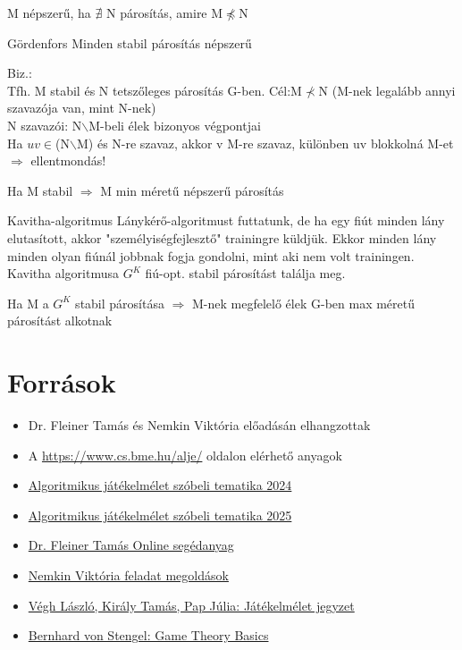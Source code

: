 	\begin{observation}{}{}
		M népszerű, ha $\nexists$ N párosítás, amire M$\npreceq$N
	\end{observation}
	
	\begin{theorem}{Gördenfors}{}
		Minden stabil párosítás népszerű
	\end{theorem}
	Biz.:\\
	Tfh. M stabil és N tetszőleges párosítás G-ben. Cél:M$\nprec$N (M-nek legalább annyi szavazója van, mint N-nek)\\
	N szavazói: N$\backslash$M-beli élek bizonyos végpontjai\\
	Ha $uv \in$(N$\backslash$M) és N-re szavaz, akkor v M-re szavaz, különben uv blokkolná M-et $\Rightarrow$ ellentmondás!
	
	\begin{statement}{}{}
		Ha M stabil $\Rightarrow$ M min méretű népszerű párosítás
	\end{statement}
	
	\begin{theorem}{Kavitha-algoritmus}{}
		Lánykérő-algoritmust futtatunk, de ha egy fiút minden lány elutasított, akkor "személyiségfejlesztő" trainingre küldjük. Ekkor minden lány minden olyan fiúnál jobbnak fogja gondolni, mint aki nem volt trainingen.\\
		Kavitha algoritmusa $G^K$ fiú-opt. stabil párosítást találja meg.
	\end{theorem}
	
	\begin{theorem}{}{}
		Ha M a $G^K$ stabil párosítása $\Rightarrow$ M-nek megfelelő élek G-ben max méretű párosítást alkotnak
	\end{theorem}
	
	\newpage
	\section{Források}
	\begin{itemize}
		\item Dr. Fleiner Tamás és Nemkin Viktória előadásán elhangzottak
		\item A \url{https://www.cs.bme.hu/alje/} oldalon elérhető anyagok
		\item \href{https://www.cs.bme.hu/\%7Efleiner/alje2024/tematika.pdf}{Algoritmikus játékelmélet szóbeli tematika 2024}
		\item \href{https://www.cs.bme.hu/%7Efleiner/alje2025/tematika.pdf}{Algoritmikus játékelmélet szóbeli tematika 2025}
		\item \href{https://www.cs.bme.hu/~fleiner/alje2025/segedanyag.pdf}{Dr. Fleiner Tamás Online segédanyag}
		\item \href{https://cs.bme.hu/~nemkin/jatek/}{Nemkin Viktória feladat megoldások}
		\item \href{http://tkiraly.web.elte.hu/students/jatekelmelet_jegyzet.pdf}{Végh László, Király Tamás, Pap Júlia: Játékelmélet jegyzet}
		\item \href{http://www.maths.lse.ac.uk/personal/stengel/lectnotes1-7.pdf}{Bernhard von Stengel: Game Theory Basics}   
	\end{itemize}
	

